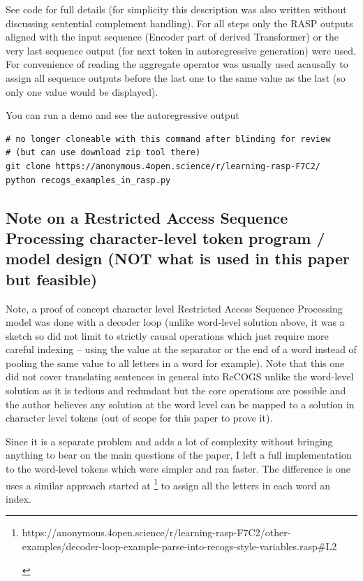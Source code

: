 \documentclass[11pt]{article}
\begin{document}
See code for full details (for simplicity this description was also written without discussing sentential complement handling). For all steps only the RASP outputs aligned with the input sequence (Encoder part of derived Transformer) or the very last sequence output (for next token in autoregressive generation) were used. For convenience of reading the aggregate operator was usually used acausally to assign all sequence outputs before the last one to the same value as the last (so only one value would be displayed).

You can run a demo and see the autoregressive output 

\begin{tiny}
\begin{verbatim}
# no longer cloneable with this command after blinding for review
# (but can use download zip tool there)
git clone https://anonymous.4open.science/r/learning-rasp-F7C2/
python recogs_examples_in_rasp.py
\end{verbatim}
\end{tiny}

\clearpage

\subsection{Note on a Restricted Access Sequence Processing character-level token program / model design (NOT what is used in this paper but feasible)}
\label{rasp_character_level_model_notes}

Note, a proof of concept character level Restricted Access Sequence Processing model was done with a decoder loop (unlike word-level solution above, it was a sketch so did not limit to strictly causal operations which just require more careful indexing -- using the value at the separator or the end of a word instead of pooling the same value to all letters in a word for example). Note that this one did not cover translating sentences in general into ReCOGS unlike the word-level solution as it is tedious and redundant but the core operations are possible and the author believes any solution at the word level can be mapped to a solution in character level tokens (out of scope for this paper to prove it).

Since it is a separate problem and adds a lot of complexity without bringing anything to bear on the main questions of the paper, I left a full implementation to the word-level tokens which were simpler and ran faster. The difference is one uses a similar approach started at \footnote{\begin{footnotesize} https://anonymous.4open.science/r/learning-rasp-F7C2/other-examples/decoder-loop-example-parse-into-recogs-style-variables.rasp\#L2 \end{footnotesize}} to assign all the letters in each word an index. 
\end{document}
